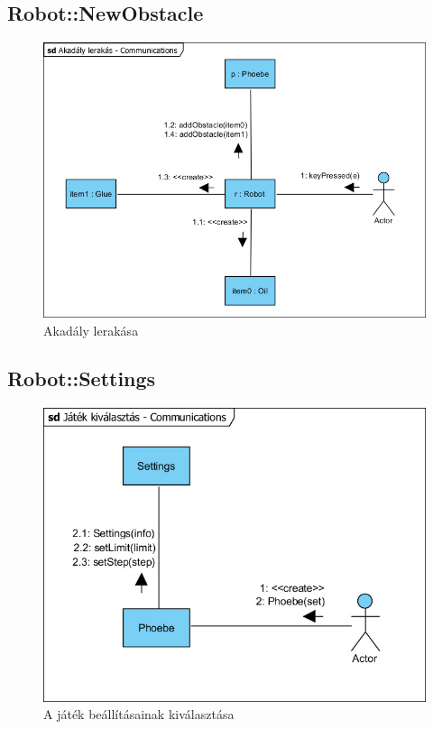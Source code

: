 \subsection{Robot::NewObstacle}
\begin{figure}[h]
\begin{center}
\includegraphics[width=17cm]{images/Commdiagrams/Comm_RobotAddObstacle.jpg}
\caption{Akadály lerakása}
\label{fig:example9}
\end{center}
\end{figure}
\pagebreak

\subsection{Robot::Settings}
\begin{figure}[h]
\begin{center}
\includegraphics[width=17cm]{images/Commdiagrams/Comm_Settings.jpg}
\caption{A játék beállításainak kiválasztása}
\label{fig:example10}
\end{center}
\end{figure}
\pagebreak

